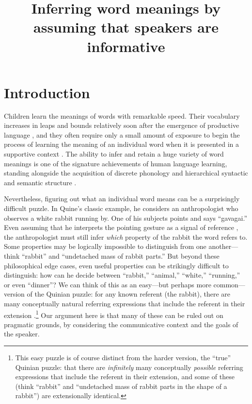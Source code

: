 \documentclass[man,noapacite]{apa2}
\title{Inferring word meanings by assuming that speakers are informative}
\begin{document}
\maketitle                            


\section{Introduction}

Children learn the meanings of words with remarkable speed. Their vocabulary increases in leaps and bounds relatively soon after the emergence of productive language \cite{fenson1994}, and they often require only a small amount of exposure to begin the process of learning the meaning of an individual word when it is presented in a supportive context \cite{carey1978,markson1997}. The ability to infer and retain a huge variety of word meanings is one of the signature achievements of human language learning, standing alongside the acquisition of discrete phonology and hierarchical syntactic and semantic structure \cite{pinker2005}.

Nevertheless, figuring out what an individual word means can be a surprisingly difficult puzzle. In Quine's \citeyear{quine1960} classic example, he considers an anthropologist who observes a white rabbit running by. One of his subjects points and says ``gavagai.'' Even assuming that he interprets the pointing gesture as a signal of reference \cite{wittgenstein1953,tomasello2008}, the anthropologist must still infer \emph{which} property of the rabbit the word refers to.  Some properties may be logically impossible to distinguish from one another---think ``rabbit'' and ``undetached mass of rabbit parts.'' But beyond these philosophical edge cases, even useful properties can be strikingly difficult to distinguish: how can he decide between ``rabbit,'' ``animal,'' ``white,'' ``running,'' or even ``dinner''? We can think of this as an easy---but perhaps more common---version of the Quinian puzzle: for any known referent (the rabbit), there are many conceptually natural referring expressions that include the referent in their extension \cite{gleitman1992}.\footnote{This easy puzzle is of course distinct from the harder version, the ``true'' Quinian puzzle: that there are \emph{infinitely} many conceptually \emph{possible} referring expressions that include the referent in their extension, and some of these (think ``rabbit'' and ``undetached mass of rabbit parts in the shape of a rabbit'') are extensionally identical.} Our argument here is that many of these can be ruled out on pragmatic grounds, by considering the communicative context and the goals of the speaker. 
\end{document}

